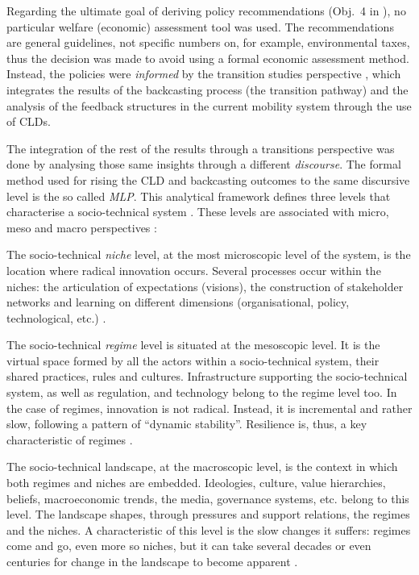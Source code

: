 Regarding the ultimate goal of deriving policy recommendations (Obj.~4 in ), no particular welfare (economic) assessment tool was used. The recommendations are general guidelines, not specific numbers on, for example, environmental taxes, thus the decision was made to avoid using a formal economic assessment method. Instead, the policies were \emph{informed} by the transition studies perspective \parencite{kemp2007_Transitionmanagementas}, which integrates the results of the backcasting process (the transition pathway) and the analysis of the feedback structures in the current mobility system through the use of CLDs.

The integration of the rest of the results through a transitions perspective was done by analysing those same insights through a different \emph{discourse}. The formal method used for rising the CLD and backcasting outcomes to the same discursive level is the so called \emph{\gls{MLP}}. This analytical framework defines three levels that characterise a socio-technical system \parencite{geels2001_Technologicaltransitionsas}. These levels are associated with micro, meso and macro perspectives \parencite{rotmans2001_Moreevolutionthan}:
\begin{enumeratealpha}
\item The socio-technical \emph{niche} level, at the most microscopic level of the system, is the location where radical innovation occurs. Several processes occur within the niches: the articulation of expectations (visions), the construction of stakeholder networks and learning on different dimensions (organisational, policy, technological, etc.) \parencite{geels2012_MultiLevelPerspective}.
\item The socio-technical \emph{regime} level is situated at the mesoscopic level. It is the virtual space formed by all the actors within a socio-technical system, their shared practices, rules and cultures. Infrastructure supporting the socio-technical system, as well as regulation, and technology belong to the regime level too. In the case of regimes, innovation is not radical. Instead, it is incremental and rather slow, following a pattern of ``dynamic stability''. Resilience is, thus, a key characteristic of regimes \parencite{geels2012_MultiLevelPerspective}.
\item The socio-technical landscape, at the macroscopic level, is the context in which both regimes and niches are embedded. Ideologies, culture, value hierarchies, beliefs, macroeconomic trends, the media, governance systems, etc. belong to this level. The landscape shapes, through pressures and support relations, the regimes and the niches. A characteristic of this level is the slow changes it suffers: regimes come and go, even more so niches, but it can take several decades or even centuries for change in the landscape to become apparent \parencite{rotmans2001_Moreevolutionthan,kemp2007_Transitionmanagementas,geels2012_MultiLevelPerspective}.
\end{enumeratealpha}

